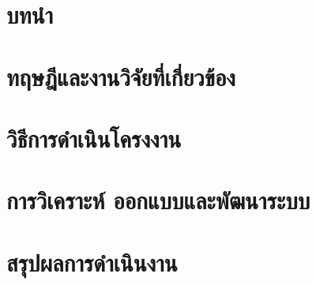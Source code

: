 \documentclass{cskkuproject}
\begin{document}

\setcounter{page}{0}
\renewcommand{\thepage}{\ThaiAlph{\value{page}}}

\begin{abstractTH}

\end{abstractTH}

\begin{abstractEN}

\end{abstractEN}

\begin{acknowledgement}

\end{acknowledgement}

\tableofcontents
\clearpage
\listoffigures
\clearpage
\listoftables
\clearpage

\setcounter{page}{1}

\chapter{บทนำ}

\chapter{ทฤษฎีและงานวิจัยที่เกี่ยวข้อง}

\chapter{วิธีการดำเนินโครงงาน}

\chapter{การวิเคราะห์ ออกแบบและพัฒนาระบบ}

\chapter{สรุปผลการดำเนินงาน}


\clearpage
{}
\makeatletter
\let\ps@plain\ps@empty
\makeatother
\nocite{*}





\begin{biography}

\end{biography}
\end{document}
